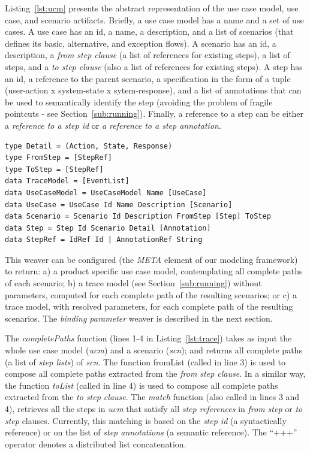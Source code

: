 \documentclass{llncs}
\begin{document}
Listing~\ref{lst:ucm} presents the abstract representation of the
use case model, use case, and scenario artifacts. Briefly, a use
case model has a name and a set of use cases. A use case has an id,
a name, a description, and a list of scenarios (that defines its
basic, alternative, and exception flows). A scenario has an id, a
description, a \emph{from step clause} (a list of references for
existing steps), a list of steps, and a \emph{to step clause} (also
a list of references for existing steps). A step has an id, a
reference to the parent scenario, a specification in the form of a tuple
(user-action x system-state x sytem-response), and a list of annotations
that can be used to semantically identify the step (avoiding
the problem of fragile pointcuts - see Section~\ref{sub:running}).
Finally, a reference to a step can be either a \emph{reference to a
step id} or \emph{a reference to a step annotation}.

\begin{lstlisting}[belowskip=10pt,frame=tb,caption={Use Case and Scenario representation},label=lst:ucm]
type Detail = (Action, State, Response)
type FromStep = [StepRef]
type ToStep = [StepRef]
data TraceModel = [EventList]
data UseCaseModel = UseCaseModel Name [UseCase]
data UseCase = UseCase Id Name Description [Scenario]
data Scenario = Scenario Id Description FromStep [Step] ToStep
data Step = Step Id Scenario Detail [Annotation]
data StepRef = IdRef Id | AnnotationRef String
\end{lstlisting}

This weaver can be configured (the \emph{META} element of
our modeling framework) to return: a) a product specific use case
model, contemplating all complete paths of each scenario; b) a trace
model (see Section~\ref{sub:running}) without parameters, computed
for each complete path of the resulting scenarios; or c) a trace model,
with resolved parameters, for each complete path of the resulting
scenarios. The \emph{binding parameter} weaver is described
in the next section.

The \emph{completePaths} function (lines 1-4 in Listing~\ref{lst:trace}) 
takes as input the whole use case model (\emph{ucm}) and a scenario (\emph{scn});
and returns all complete paths (a list of \emph{step lists}) of
\emph{scn}. The function fromList (called in line 3) is used to
compose all complete paths extracted from the \emph{from step
clause}. In a similar way, the function \emph{toList} (called in
line 4) is used to compose all complete paths extracted from the
\emph{to step clause}. The \emph{match} function (also called in
lines 3 and 4), retrieves all the steps in \emph{ucm} that satisfy all 
\emph{step references} in \emph{from step} or \emph{to step}
clauses. Currently, this matching is based on the \emph{step id} (a
syntactically reference) or on the list of \emph{step annotations}
(a semantic reference). The ``+++'' operator denotes a distributed
list concatenation.
\end{document}
